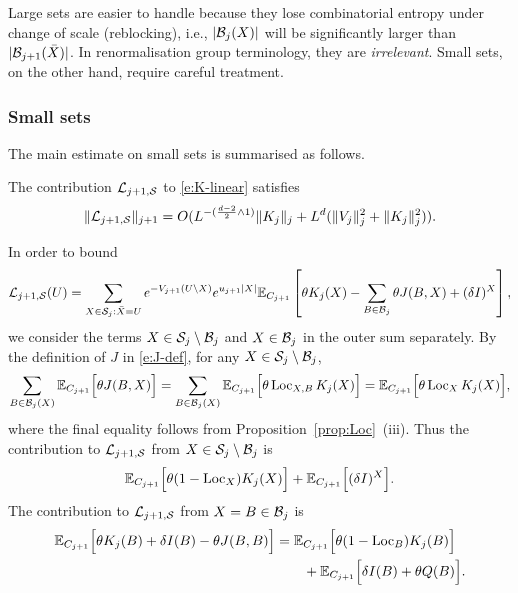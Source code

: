 \documentclass[11pt]{amsart}
\numberwithin{equation}{section}
\numberwithin{theorem}{section}
\newcommand{\1}{{\bf 1}}
\newcommand{\dplus}{(\frac{d-2}{2} \wedge 1)}
\newcommand{\Loc}{\operatorname{Loc}}
\begin{document}
Large sets 
are easier to handle because they lose combinatorial entropy under
change of scale (reblocking), i.e.,
$|\mathcal B_{j}(X)|$ will be significantly larger than $|\mathcal B_{j+1}(\bar{X})|$. In renormalisation group
terminology, they are \emph{irrelevant}.
Small sets, on the other hand, require careful treatment.

\subsubsection{Small sets}
\label{sec:K-smallset}

The main estimate on small sets is summarised as follows.

\begin{proposition}
  \label{prop:SmallSetLin}
  The contribution $\mathcal L_{j+1,\mathcal S}$ to \eqref{e:K-linear} satisfies
  \begin{equation}
  \label{e:SmallSetLin}
  \|\cL_{j+1, \cS}\|_{j+1} =
  O(L^{-\dplus}\|K_j\|_j+L^{d}(\|V_j\|_j^2 + \|K_j\|_j^2)).
\end{equation}
\end{proposition}


In order to bound
\begin{equation} \label{e:K-linear-smallset}
    \mathcal L_{j+1,\mathcal S}(U)
  = \sum_{X\in \mathcal S_j: \bar X=U} e^{-V_{j+1}(U\setminus X)} e^{u_{j+1}|X|} \mathbb{E}_{C_{j+1}}\left[{\theta K_j(X) 
    - \sum_{B\in \mathcal B_j} \theta J(B,X)
    + (\delta I)^X }\right],
\end{equation}
we consider the terms $X \in \mathcal S_j \setminus \mathcal B_j$ and $X\in \mathcal B_j$
in the outer sum separately.  By the definition of $J$ in
\eqref{e:J-def}, for any $X \in \mathcal S_j \setminus \mathcal B_j$,
\begin{equation}
  \sum_{B \in \cB_j(X)}
  \E_{C_{j+1}} \qB{ \theta  J(B,X)} 
  =
  \sum_{B \in \cB_j(X)} 
  \E_{C_{j+1}} \qB{ \theta \Loc_{X,B}K_j(X) }
  =
    \E_{C_{j+1}} \qB{ \theta  \Loc_{X}  K_j(X) },
\end{equation}
where the final equality follows from
Proposition~\ref{prop:Loc}~(iii). Thus the contribution to
$\mathcal L_{j+1, \mathcal S}$ from $X \in \mathcal S_j\setminus \mathcal B_j$ is
\begin{equation} \label{e:Ksmallset}
  \E_{C_{j+1}} \qB{ \theta (1-\Loc_X)  K_{j}(X)}
  + \E_{C_{j+1}}\qB{ (\delta I)^X} .
\end{equation}
The contribution to $\mathcal L_{j+1, \mathcal S}$ 
from $X= B \in \mathcal B_j$ is
\begin{align} \label{e:Kblock}
    \E_{C_{j+1}}\qB{\theta K_j(B) 
      + 
      \delta I(B) 
      - 
      \theta J(B,B)}
  &=\E_{C_{j+1}} \qB{ \theta (1-\Loc_B)K_j(B)}
    \nnb
    &\qquad
  + \E_{C_{j+1}} \qB{\delta I(B)  + \theta Q(B)}.
\end{align}
\end{document}
